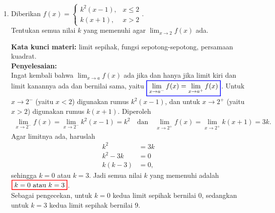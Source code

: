 \documentclass[10pt,openany,a4paper]{article}
\theoremstyle{definition}
\theoremstyle{definition}
\theoremstyle{plain}
\newenvironment{jawab}[2][tes]{%
\par\noindent\textbf{Kata kunci materi:} #1.\\
\textbf{Penyelesaian:} #2%
}{}
\begin{document}
\begin{enumerate}
    \item Diberikan $f(x)=\begin{cases}
        k^2(x-1), & x\leq 2\\
        k(x+1), & x>2
    \end{cases}$.\\
    Tentukan semua nilai $k$ yang memenuhi agar $\displaystyle\lim_{x\to 2}f(x)$ ada.
    \begin{jawab}[limit sepihak, fungsi sepotong-sepotong, persamaan kuadrat]{~\\
        Ingat kembali bahwa $\displaystyle\lim_{x\to a}f(x)$ ada jika dan hanya jika limit kiri dan limit kanannya ada dan bernilai sama, yaitu $\colorlet{oldcolor}{.}
        \color{blue}
        \setlength{\fboxrule}{1pt} \boxed{\color{oldcolor}\lim_{x \to a^-} f(x) = \lim_{x \to a^+} f(x)}\color{oldcolor}$. Untuk $x\to 2^-$ (yaitu $x<2$) digunakan rumus $k^2(x-1)$, dan untuk $x\to 2^+$ (yaitu $x>2$) digunakan rumus $k(x+1)$. Diperoleh
        \begin{align*}
            \lim_{x\to 2^-} f(x) = \lim_{x\to 2^-} k^2(x-1) = k^2 \quad\text{dan}\quad \lim_{x\to 2^+} f(x) = \lim_{x\to 2^+} k(x+1) = 3k.
        \end{align*}
        Agar limitnya ada, haruslah
        \begin{align*}
            k^2 &= 3k\\
            k^2-3k &= 0\\
            k(k-3) &= 0,
        \end{align*}
        sehingga $k=0$ atau $k=3$. Jadi semua nilai $k$ yang memenuhi adalah $\colorlet{oldcolor}{.}
        \color{red}
        \setlength{\fboxrule}{1pt} \boxed{\color{oldcolor}k=0 \text{ atau } k=3}\color{oldcolor}$.\\
        Sebagai pengecekan, untuk $k=0$ kedua limit sepihak bernilai $0$, sedangkan untuk $k=3$ kedua limit sepihak bernilai $9$.
    }
    \end{jawab}


\end{enumerate}
\end{document}
